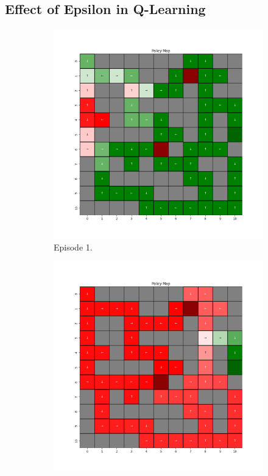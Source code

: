 \documentclass{assignment}
\begin{document}
\subsection{Effect of Epsilon in Q-Learning}

\begin{figure}[H]
    \begin{subfigure}{0.3\textwidth}
        \includegraphics[width=\textwidth]{figures/policy_q/epsilon_sweep/policy_alpha_0.1_gamma_0.95_epsilon_0.0_iteration_1.png}
    \caption{Episode 1.}
    \end{subfigure}\hfill
    \begin{subfigure}{0.3\textwidth}
        \includegraphics[width=\textwidth]{figures/policy_q/epsilon_sweep/policy_alpha_0.1_gamma_0.95_epsilon_0.0_iteration_50.png}

\end{subfigure}
\end{figure}
\end{document}
